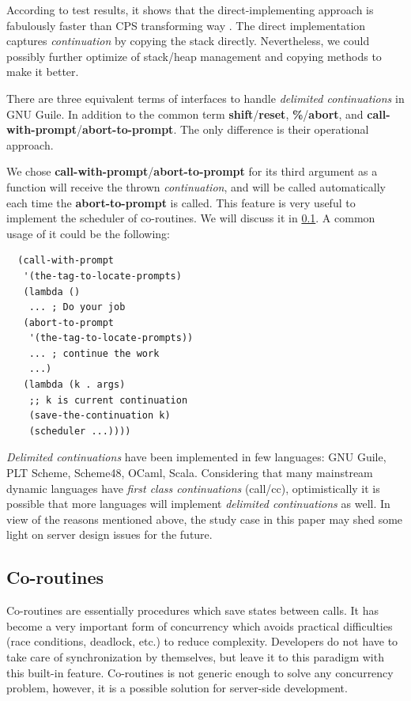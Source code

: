 \documentclass[numbers,numberedpars]{sigplanconf}
\begin{document}
According to test results, it shows that the direct-implementing approach is fabulously faster than CPS transforming way
\citep{Gasbichler:2002:FSC:581478.581504}. The direct implementation captures {\it continuation} by copying the stack directly.
Nevertheless, we could possibly further optimize of stack/heap management and copying methods to make it better.

There are three equivalent terms of interfaces to handle {\it delimited continuations} in GNU Guile. In addition to the common term
{\bf shift}/{\bf reset},
{\bf \%}/{\bf abort}, and {\bf call-with-prompt}/{\bf abort-to-prompt}. The only difference is their operational approach.

We chose {\bf call-with-prompt}/{\bf abort-to-prompt} for its third argument as a function will receive the thrown {\it continuation}, and will be
called automatically each time the {\bf abort-to-prompt} is called. This feature is very useful to implement the scheduler of co-routines. We will discuss it
in \ref{Co-routines}. A common usage of it could be the following:

\begin{lstlisting}
  (call-with-prompt
   '(the-tag-to-locate-prompts)
   (lambda ()
    ... ; Do your job
   (abort-to-prompt
    '(the-tag-to-locate-prompts))
    ... ; continue the work
    ...)
   (lambda (k . args)
    ;; k is current continuation
    (save-the-continuation k)
    (scheduler ...))))
\end{lstlisting}

{\it Delimited continuations} have been implemented in few languages: GNU Guile, PLT Scheme, Scheme48, OCaml, Scala. Considering that many mainstream dynamic languages have {\it first class continuations} (call/cc), optimistically it is possible that more languages will implement {\it delimited continuations} as well. In view of the reasons mentioned above, the study case in this paper may shed some light on server
design issues for the future.

\subsection{Co-routines} \label{Co-routines}

Co-routines are essentially procedures which save states between calls. It has become a very important form of concurrency which avoids practical difficulties (race conditions, deadlock, etc.) to reduce complexity. Developers do not have to take care of synchronization by themselves, but leave it to this paradigm with this built-in feature. Co-routines is not generic enough to solve any concurrency problem, however,
it is a possible solution for server-side development.
\end{document}
